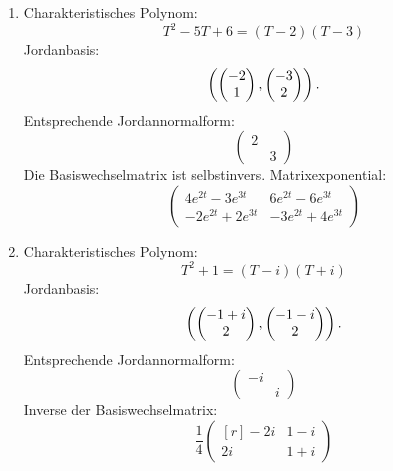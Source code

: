 \documentclass[a4paper, 10pt]{scrartcl}
\begin{document}
\begin{solution}
  \begin{enumerate}
    \item
      Charakteristisches Polynom:
      \[
        T^2 - 5T + 6 = (T-2)(T-3)
      \]
      Jordanbasis:
      \[
        \left( \begin{pmatrix} -2 \\ 1 \end{pmatrix}, \begin{pmatrix} -3 \\ 2 \end{pmatrix} \right).
      \]
      Entsprechende Jordannormalform:
      \[
        \begin{pmatrix}
          2 &   \\
            & 3
        \end{pmatrix}
      \]
      Die Basiswechselmatrix ist selbstinvers.
      Matrixexponential:
      \[
        \begin{pmatrix}
           4 e^{2t} - 3 e^{3t}  &  6 e^{2t} - 6 e^{3t}  \\
          -2 e^{2t} + 2 e^{3t}  & -3 e^{2t} + 4 e^{3t}
        \end{pmatrix}
      \]
    \item
      Charakteristisches Polynom:
      \[
        T^2 + 1 = (T-i)(T+i)
      \]
      Jordanbasis:
      \[
        \left( \begin{pmatrix} -1+i \\ 2 \end{pmatrix}, \begin{pmatrix} -1-i \\ 2 \end{pmatrix} \right).
      \]
      Entsprechende Jordannormalform:
      \[
        \begin{pmatrix}
          -i  &   \\
              & i 
        \end{pmatrix}
      \]
      Inverse der Basiswechselmatrix:
      \[
        \frac{1}{4}
        \begin{pmatrix*}[r]
          -2i & 1-i \\
           2i & 1+i
        \end{pmatrix*}
      \]


\end{enumerate}
\end{solution}
\end{document}
